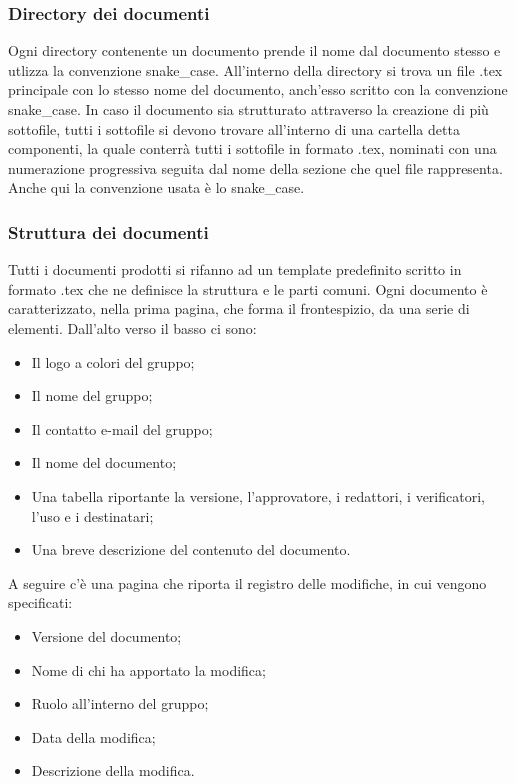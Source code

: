 \documentclass[../norme_di_progetto.tex]{subfiles}
\begin{document}
\subsubsection{Directory dei documenti}
Ogni directory contenente un documento prende il nome dal documento stesso e utlizza la convenzione snake\_case. All'interno della directory si trova un file .tex principale con lo stesso nome del documento, anch'esso scritto con la convenzione snake\_case. In caso il documento sia strutturato attraverso la creazione di più sottofile, tutti i sottofile si devono trovare all'interno di una cartella detta componenti, la quale conterrà tutti i sottofile in formato .tex, nominati con una numerazione progressiva seguita dal nome della sezione che quel file rappresenta. Anche qui la convenzione usata è lo snake\_case.

\subsubsection{Struttura dei documenti}
Tutti i documenti prodotti si rifanno ad un template predefinito scritto in formato .tex che ne definisce la struttura e le parti comuni. Ogni documento è caratterizzato, nella prima pagina, che forma il frontespizio, da una serie di elementi. Dall'alto verso il basso ci sono:
\begin{itemize}
    \item Il logo a colori del gruppo;
    \item Il nome del gruppo;
    \item Il contatto e-mail del gruppo;
    \item Il nome del documento;
    \item Una tabella riportante la versione, l'approvatore, i redattori, i verificatori, l'uso e i destinatari;
    \item Una breve descrizione del contenuto del documento.
\end{itemize}
A seguire c'è una pagina che riporta il registro delle modifiche, in cui vengono specificati:
\begin{itemize}
    \item Versione del documento;
    \item Nome di chi ha apportato la modifica;
    \item Ruolo all'interno del gruppo;
    \item Data della modifica;
    \item Descrizione della modifica.
\end{itemize}
\end{document}
